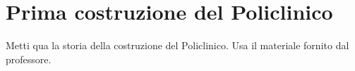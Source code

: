\chapter{Prima costruzione del Policlinico}
\thispagestyle{empty}
Metti qua la storia della costruzione del Policlinico. Usa il materiale fornito dal professore.